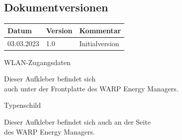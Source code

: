\documentclass[a4paper,10pt]{article}
\begin{document}
\begin{multicols*}{2}
	\section{Dokumentversionen}
	\begin{tabular}{lll}
		\toprule
		Datum      & Version & Kommentar                       \\
		\midrule
		03.03.2023 & 1.0     & Initialversion                  \\
		\bottomrule
	\end{tabular}

	\vfill
	\null
	\newpage

	\columnbreak
\appendix



	\newpage
	\pagestyle{empty}
	\null
	\vfill
	WLAN-Zugangsdaten
	\begin{tcolorbox}[width=4.2cm,height=2.7cm, boxrule=0.25mm]

	\end{tcolorbox}
	Dieser Aufkleber befindet sich\\ auch unter der Frontplatte des WARP Energy
	Managers.
	\columnbreak

	\null
	\vfill
	Typenschild
	\begin{tcolorbox}[width=7.8cm,height=4.1cm, boxrule=0.25mm]

	\end{tcolorbox}
	Dieser Aufkleber befindet sich auch an der Seite\\ des WARP Energy Managers.
\end{multicols*}
\end{document}
